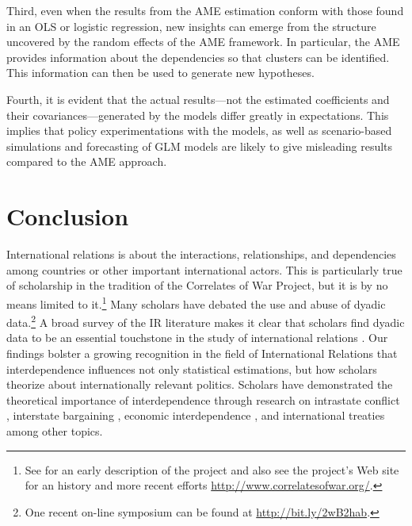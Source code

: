 \documentclass[12pt]{amsart}
\begin{document}
Third, even when the results from the AME estimation conform with those found in an OLS or logistic regression, new insights can emerge from the structure uncovered by the random effects of the AME framework. In particular, the AME provides information about the dependencies so that clusters can be identified.  This information can then be used to generate new hypotheses.

Fourth, it is evident that the actual results---not the estimated coefficients and their covariances---generated by the models differ greatly in expectations.  This implies that policy experimentations with the models, as well as scenario-based simulations and forecasting of GLM models are likely to give misleading results compared to the AME approach.

\section{\textbf{Conclusion}}

International relations is about the interactions, relationships, and dependencies among countries or other important international actors. This is particularly true of scholarship in the tradition of the Correlates of War Project, but it is by no means limited to it.\footnote{See \cite{singer:1972} for an early description of the project and also see the project's Web site for an history and more recent efforts \url{http://www.correlatesofwar.org/}.} Many scholars have debated the use and abuse of dyadic data.\footnote{One recent on-line symposium can be found at \url{http://bit.ly/2wB2hab}.} A broad survey of the IR literature makes it clear that scholars find dyadic data to be an essential touchstone in the study of international relations \citep{erikson:pinto:2014,aronow:etal:2015}. Our findings bolster a growing recognition in the field of International Relations that interdependence influences not only statistical estimations, but how scholars theorize about internationally relevant politics. Scholars have demonstrated the theoretical importance of interdependence through research on intrastate conflict \citep{dorff:etal:2020}, interstate bargaining \citep{gallop:2017}, economic interdependence \citep{maoz:2009a}, and international treaties \citep{kinne:2013} among other topics.
\end{document}

